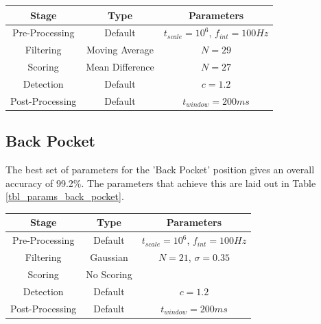                 \begin{center}
                    \label{tbl_params_front_pocket}
                    \begin{tabular}{|c|c|c|}
                        \hline
                        Stage & Type & Parameters \\
                        \hline
                        Pre-Processing & Default & $t_{scale}=10^6$, $f_{int}=100Hz$ \\
                        Filtering & Moving Average & $N=29$ \\
                        Scoring & Mean Difference & $N=27$ \\
                        Detection & Default & $c=1.2$ \\
                        Post-Processing & Default & $t_{window}=200ms$ \\
                        \hline
                    \end{tabular}
                \end{center}  

            \subsection{Back Pocket}

                The best set of parameters for the 'Back Pocket' position gives an overall accuracy of 99.2\%. The parameters that achieve this are laid out in Table \ref{tbl_params_back_pocket}.

                \begin{center}
                    \label{tbl_params_back_pocket}
                    \begin{tabular}{|c|c|c|}
                        \hline
                        Stage & Type & Parameters \\
                        \hline
                        Pre-Processing & Default & $t_{scale}=10^6$, $f_{int}=100Hz$ \\
                        Filtering & Gaussian & $N=21$, $\sigma=0.35$ \\
                        Scoring & No Scoring & \\
                        Detection & Default & $c=1.2$ \\
                        Post-Processing & Default & $t_{window}=200ms$ \\
                        \hline
                    \end{tabular}
                \end{center}

